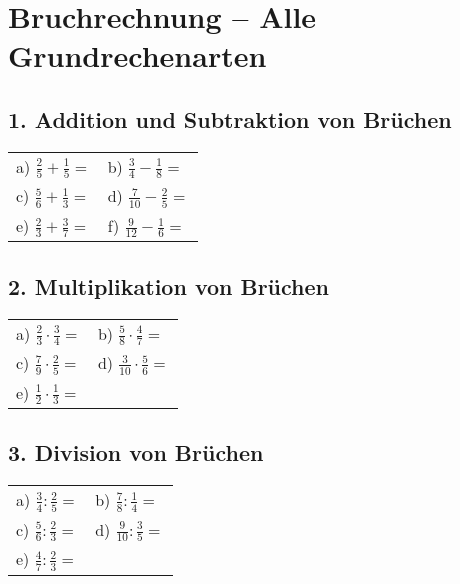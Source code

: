 
\section*{Bruchrechnung – Alle Grundrechenarten}

\subsection*{1. Addition und Subtraktion von Brüchen}
\begin{tabular}{p{} p{}}
 a) $\frac{2}{5} + \frac{1}{5} =$ & b) $\frac{3}{4} - \frac{1}{8} =$ \\
 c) $\frac{5}{6} + \frac{1}{3} =$ & d) $\frac{7}{10} - \frac{2}{5} =$ \\
 e) $\frac{2}{3} + \frac{3}{7} =$ & f) $\frac{9}{12} - \frac{1}{6} =$ \\
\end{tabular}

\vspace{0.5cm}

\subsection*{2. Multiplikation von Brüchen}
\begin{tabular}{p{} p{}}
 a) $\frac{2}{3} \cdot \frac{3}{4} =$ & b) $\frac{5}{8} \cdot \frac{4}{7} =$ \\
 c) $\frac{7}{9} \cdot \frac{2}{5} =$ & d) $\frac{3}{10} \cdot \frac{5}{6} =$ \\
 e) $\frac{1}{2} \cdot \frac{1}{3} =$ & \\
\end{tabular}

\vspace{0.5cm}

\subsection*{3. Division von Brüchen}
\begin{tabular}{p{} p{}}
 a) $\frac{3}{4} : \frac{2}{5} =$ & b) $\frac{7}{8} : \frac{1}{4} =$ \\
 c) $\frac{5}{6} : \frac{2}{3} =$ & d) $\frac{9}{10} : \frac{3}{5} =$ \\
 e) $\frac{4}{7} : \frac{2}{3} =$ & \\
\end{tabular}

